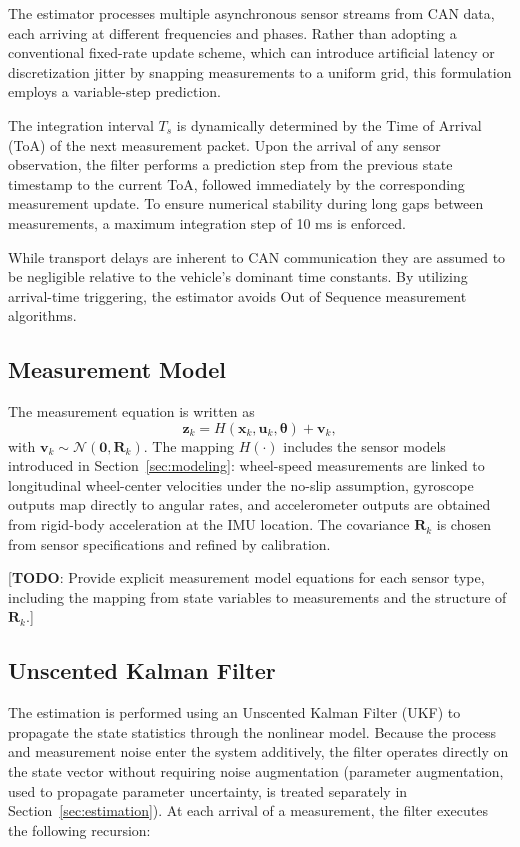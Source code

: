 \documentclass[conference]{IEEEtran}
\begin{document}
The estimator processes multiple asynchronous sensor streams from CAN data, each arriving at different frequencies and phases. Rather than adopting a conventional fixed-rate update scheme, which can introduce artificial latency or discretization jitter by snapping measurements to a uniform grid, this formulation employs a variable-step prediction.

The integration interval $T_s$ is dynamically determined by the Time of Arrival (ToA) of the next measurement packet. Upon the arrival of any sensor observation, the filter performs a prediction step from the previous state timestamp to the current ToA, followed immediately by the corresponding measurement update. To ensure numerical stability during long gaps between measurements, a maximum integration step of 10 ms is enforced.

While transport delays are inherent to CAN communication they are assumed to be negligible relative to the vehicle's dominant time constants. By utilizing arrival-time triggering, the estimator avoids Out of Sequence measurement algorithms.


\subsection{Measurement Model}
The measurement equation is written as
\begin{equation}
    \bm z_k = H(\bm x_k, \bm u_k, \bm\theta) + \bm v_k,
\end{equation}
with $\bm v_k \sim \mathcal{N}(\bm 0,\bm R_k)$. The mapping $H(\cdot)$ includes the sensor models introduced in Section~\ref{sec:modeling}: wheel-speed measurements are linked to longitudinal wheel-center velocities under the no-slip assumption, gyroscope outputs map directly to angular rates, and accelerometer outputs are obtained from rigid-body acceleration at the IMU location. The covariance $\bm R_k$ is chosen from sensor specifications and refined by calibration.

[\textbf{TODO}: Provide explicit measurement model equations for each sensor type, including the mapping from state variables to measurements and the structure of $\bm{R}_k$.]


\subsection{Unscented Kalman Filter}
The estimation is performed using an Unscented Kalman Filter (UKF) to propagate the state statistics through the nonlinear model. Because the process and measurement noise enter the system additively, the filter operates directly on the state vector without requiring noise augmentation (parameter augmentation, used to propagate parameter uncertainty, is treated separately in Section~\ref{sec:estimation}). At each arrival of a measurement, the filter executes the following recursion:
\end{document}
